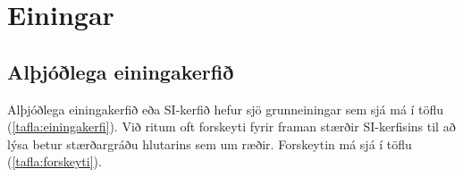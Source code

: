 \ifdefined \wholebook \else\documentclass[oneside]{book}\usepackage{EdlBook}\graphicspath{{figures/}}
\begin{document}
%
\setcounter{chapter}{0} %
%
\fi

\renewcommand{\thefigure}{\arabic{figure}}


\chapter{Einingar}

\section{Alþjóðlega einingakerfið}

Alþjóðlega einingakerfið eða SI-kerfið hefur sjö grunneiningar sem sjá má í töflu (\ref{tafla:einingakerfi}). Við ritum oft forskeyti fyrir framan stærðir SI-kerfisins til að lýsa betur stærðargráðu hlutarins sem um ræðir. Forskeytin má sjá í töflu (\ref{tafla:forskeyti}).
\end{document}
